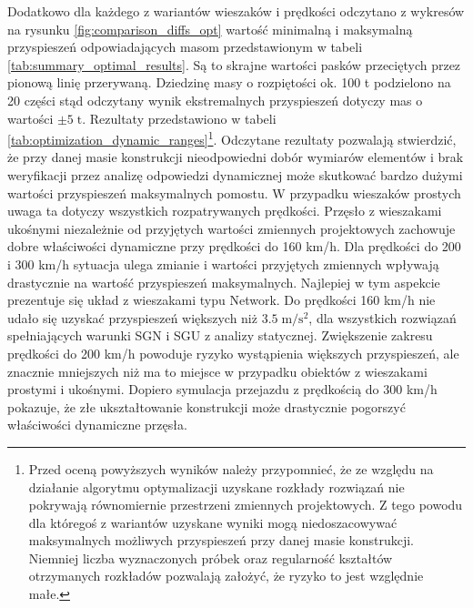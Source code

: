 Dodatkowo dla każdego z wariantów wieszaków i prędkości odczytano z wykresów na rysunku \ref{fig:comparison_diffs_opt} wartość minimalną i maksymalną przyspieszeń odpowiadających masom przedstawionym w tabeli \ref{tab:summary_optimal_results}. Są to skrajne wartości pasków przeciętych przez pionową linię przerywaną. Dziedzinę masy o rozpiętości ok. 100 t podzielono na 20 części stąd odczytany wynik ekstremalnych przyspieszeń dotyczy mas o wartości $\pm 5\;\mathrm{t}$. Rezultaty przedstawiono w tabeli \ref{tab:optimization_dynamic_ranges}\footnote{ 
	Przed oceną powyższych wyników należy przypomnieć, że ze względu na działanie algorytmu optymalizacji uzyskane rozkłady rozwiązań nie pokrywają równomiernie przestrzeni zmiennych projektowych. Z tego powodu dla któregoś z wariantów uzyskane wyniki mogą niedoszacowywać maksymalnych możliwych przyspieszeń przy danej masie konstrukcji. Niemniej liczba wyznaczonych próbek oraz regularność kształtów otrzymanych rozkładów pozwalają założyć, że ryzyko to jest względnie małe.}.
Odczytane rezultaty pozwalają stwierdzić, że przy danej masie konstrukcji nieodpowiedni dobór wymiarów elementów i brak weryfikacji przez analizę odpowiedzi dynamicznej może skutkować bardzo dużymi wartości przyspieszeń maksymalnych pomostu. W przypadku wieszaków prostych uwaga ta dotyczy wszystkich rozpatrywanych prędkości. Przęsło z wieszakami ukośnymi niezależnie od przyjętych wartości zmiennych projektowych zachowuje dobre właściwości dynamiczne przy prędkości do 160 km/h. Dla prędkości do 200 i 300 km/h sytuacja ulega zmianie i wartości przyjętych zmiennych wpływają drastycznie na wartość przyspieszeń maksymalnych. Najlepiej w tym aspekcie prezentuje się układ z wieszakami typu Network. Do prędkości 160 km/h nie udało się uzyskać przyspieszeń większych niż $3.5\;\mathrm{m/s^2}$, dla wszystkich rozwiązań spełniających warunki SGN i SGU z analizy statycznej. Zwiększenie zakresu prędkości do 200 km/h powoduje ryzyko wystąpienia większych przyspieszeń, ale znacznie mniejszych niż ma to miejsce w przypadku obiektów z wieszakami prostymi i ukośnymi. Dopiero symulacja przejazdu z prędkością do 300 km/h pokazuje, że złe ukształtowanie konstrukcji może drastycznie pogorszyć właściwości dynamiczne przęsła.






